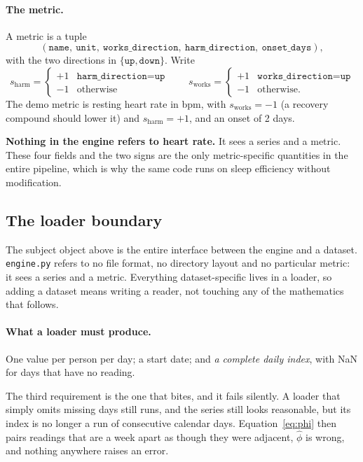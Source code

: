 \documentclass{article}
\theoremstyle{plain}
\theoremstyle{definition}
\theoremstyle{remark}
\numberwithin{equation}{section}
\begin{document}
\paragraph{The metric.} A metric is a tuple
\[
  (\texttt{name},\ \texttt{unit},\ \texttt{works\_direction},\
   \texttt{harm\_direction},\ \texttt{onset\_days}),
\]
with the two directions in $\{\texttt{up},\texttt{down}\}$. Write
\[
  s_{\mathrm{harm}} = \begin{cases} +1 & \texttt{harm\_direction} = \texttt{up}\\ -1 & \text{otherwise}\end{cases}
  \qquad
  s_{\mathrm{works}} = \begin{cases} +1 & \texttt{works\_direction} = \texttt{up}\\ -1 & \text{otherwise.}\end{cases}
\]
The demo metric is resting heart rate in bpm, with
$s_{\mathrm{works}} = -1$ (a recovery compound should lower it) and
$s_{\mathrm{harm}} = +1$, and an onset of 2 days.

\textbf{Nothing in the engine refers to heart rate.} It sees a series and a
metric. These four fields and the two signs are the only metric-specific
quantities in the entire pipeline, which is why the same code runs on sleep
efficiency without modification.

\subsection{The loader boundary}
\label{sec:loader}

The subject object above is the entire interface between the engine and a
dataset. \texttt{engine.py} refers to no file format, no directory layout and no
particular metric: it sees a series and a metric. Everything dataset-specific
lives in a loader, so adding a dataset means writing a reader, not touching any
of the mathematics that follows.

\paragraph{What a loader must produce.} One value per person per day; a start
date; and \emph{a complete daily index}, with NaN for days that have no reading.

The third requirement is the one that bites, and it fails silently. A loader
that simply omits missing days still runs, and the series still looks
reasonable, but its index is no longer a run of consecutive calendar days.
Equation~\eqref{eq:phi} then pairs readings that are a week apart as though they
were adjacent, $\hat\phi$ is wrong, and nothing anywhere raises an error.
\end{document}
